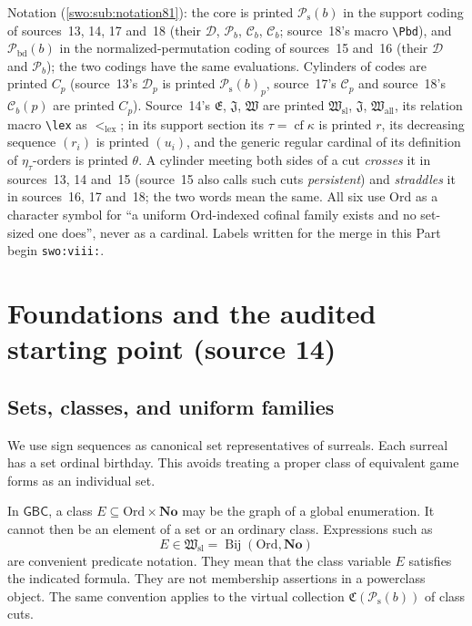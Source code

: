 \documentclass[11pt]{article}
\theoremstyle{definition}
\theoremstyle{remark}
\newcommand{\No}{\mathbf{No}}
\newcommand{\Ord}{\mathrm{Ord}}
\newcommand{\Hsl}{\mathfrak W_{\mathrm{sl}}}
\newcommand{\Hall}{\mathfrak W_{\mathrm{all}}}
\newcommand{\Jinj}{\mathfrak J}
\newcommand{\Pbd}{\mathcal P_{\mathrm{bd}}}
\newcommand{\Psupp}{\mathcal P_{\mathrm{s}}}
\newcommand{\lex}{\mathrm{lex}}
\newcommand{\cf}{\operatorname{cf}}
\newcommand{\Bij}{\operatorname{Bij}}
\newcommand{\GBC}{\mathsf{GBC}}
\newcommand{\code}[1]{\texttt{\small #1}}
\begin{document}
Notation (\cref{swo:sub:notation81}): the core is printed $\Psupp(b)$ in the
support coding of sources~13, 14, 17 and~18 (their $\mathcal D$,
$\mathcal P_b$, $\mathcal C_b$, $\mathcal C_b$; source~18's macro
\verb|\Pbd|), and $\Pbd(b)$ in the normalized-permutation coding of
sources~15 and~16 (their $\mathcal D$ and $\mathcal P_b$); the two codings
have the same evaluations. Cylinders of codes are printed $C_p$ (source~13's
$\mathcal D_p$ is printed $\Psupp(b)_p$, source~17's $\mathcal C_p$ and
source~18's $\mathcal C_b(p)$ are printed $C_p$). Source~14's $\mathfrak E$,
$\mathfrak J$, $\mathfrak W$ are printed $\Hsl$, $\Jinj$, $\Hall$, its
relation macro \verb|\lex| as $<_\lex$; in its support section its
$\tau=\cf\kappa$ is printed $r$, its decreasing sequence $(r_i)$ is printed
$(u_i)$, and the generic regular cardinal of its definition of
$\eta_\tau$-orders is printed $\theta$. A cylinder meeting both sides of a
cut \emph{crosses} it in sources~13, 14 and~15 (source~15 also calls such
cuts \emph{persistent}) and \emph{straddles} it in sources~16, 17 and~18;
the two words mean the same. All six use $\Ord$ as a character symbol for
``a uniform $\Ord$-indexed cofinal family exists and no set-sized one does'',
never as a cardinal. Labels written for the merge in this Part begin
\code{swo:viii:}.

\section{Foundations and the audited starting point (source 14)}
\label{swo:tc:sec:foundations}
\subsection{Sets, classes, and uniform families}
We use sign sequences as canonical set representatives of surreals. Each
surreal has a set ordinal birthday. This avoids treating a proper class
of equivalent game forms as an individual set.

In $\GBC$, a class $E\subseteq\Ord\times\No$ may be the graph of a
global enumeration. It cannot then be an element of a set or an ordinary
class. Expressions such as
\[
 E\in \Hsl=\Bij(\Ord,\No)
\]
are convenient predicate notation. They mean that the class variable
$E$ satisfies the indicated formula. They are not membership assertions
in a powerclass object. The same convention applies to the virtual
collection $\mathfrak C(\Psupp(b))$ of class cuts.
\end{document}
